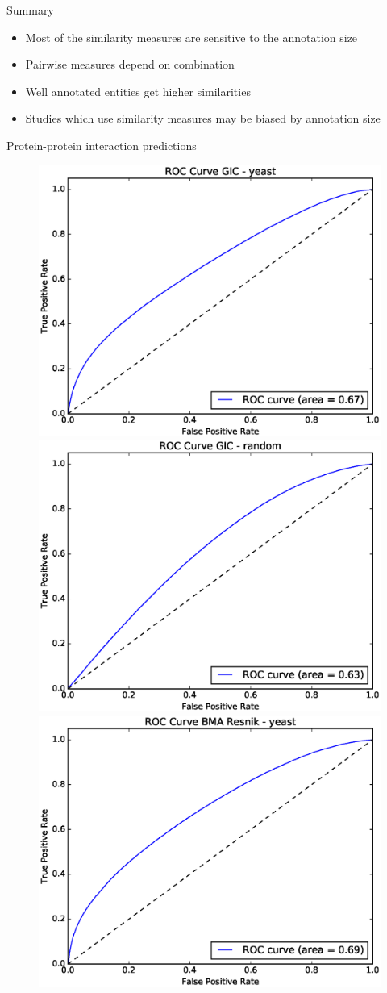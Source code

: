 \documentclass{beamer}
\begin{document}

\begin{frame}{Summary}
\begin{itemize}
\item Most of the similarity measures are sensitive to the annotation size
\item Pairwise measures depend on combination
\item Well annotated entities get higher similarities
\item Studies which use similarity measures may be biased by annotation size
\end{itemize}
\end{frame}


\begin{frame}{Protein-protein interaction predictions}
\begin{figure}
\includegraphics[width=0.5\linewidth, height=0.4\textheight]{ppi/figure_gic_yeast.eps}
\includegraphics[width=0.5\linewidth, height=0.4\textheight]{ppi/figure_gic_random.eps} \\
\includegraphics[width=0.5\linewidth, height=0.4\textheight]{ppi/figure_bma_resnik_yeast.eps}

\end{figure}
\end{frame}
\end{document}
